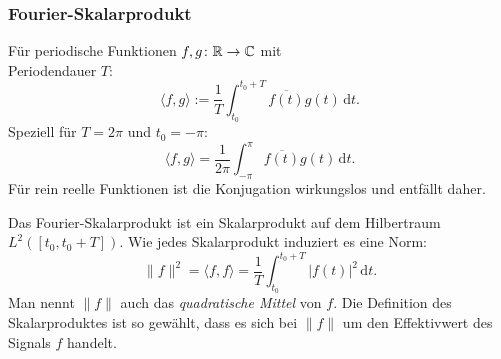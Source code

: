 \subsubsection{Fourier-Skalarprodukt}%
\begin{definition}\mbox{}\newline
Für periodische Funktionen $f,g\colon\mathbb R\to\mathbb C$ mit\\
Periodendauer $T$:
\begin{equation}\label{eq:Fourier-Skalarprodukt}
\langle f,g\rangle := \frac{1}{T}\int_{t_0}^{t_0+T} \overline{f(t)}g(t)\,\mathrm dt.
\end{equation}
Speziell für $T=2\pi$ und $t_0=-\pi$:
\begin{equation}
\langle f,g\rangle = \frac{1}{2\pi}\int_{-\pi}^{\pi} \overline{f(t)}g(t)\,\mathrm dt.
\end{equation}
Für rein reelle Funktionen ist die Konjugation wirkungslos
und entfällt daher.
\end{definition}
Das Fourier-Skalarprodukt ist ein Skalarprodukt auf dem Hilbertraum
$L^2([t_0,t_0+T])$. Wie jedes Skalarprodukt induziert es eine Norm:%
\begin{equation}\label{eq:Fourier-Norm}
\|f\|^2 = \langle f,f\rangle
= \frac{1}{T}\int_{t_0}^{t_0+T} |f(t)|^2\,\mathrm dt.
\end{equation}
Man nennt $\|f\|$ auch das \emph{quadratische Mittel} von $f$.
Die Definition des Skalarproduktes ist so gewählt, dass es sich
bei $\|f\|$ um den Effektivwert des Signals $f$ handelt.

